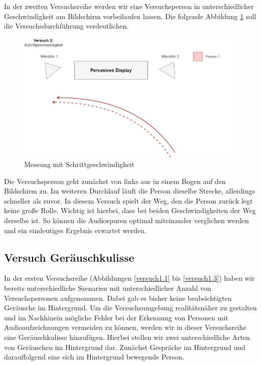 In der zweiten Versuchsreihe werden wir eine Versuchsperson in unterschiedlicher Geschwindigkeit am Bildschirm vorbeilaufen lassen. Die folgende Abbildung \ref{versuch2} soll die Versuchsdurchführung verdeutlichen. 

 
\begin{figure}[H]
	\begin{center}
		\includegraphics[width=\textwidth]{images/Versuch 2.PNG}
		\caption{Messung mit Schrittgeschwindigkeit}
	\label{versuch2}
	\end{center}
\end{figure}


Die Versuchsperson geht zunächst von links aus in einem Bogen auf den Bildschirm zu. Im weiteren Durchlauf läuft die Person dieselbe Strecke, allerdings schneller als zuvor. In diesem Versuch spielt der Weg, den die Person zurück legt keine große Rolle. Wichtig ist hierbei, dass bei beiden Geschwindigkeiten der Weg derselbe ist. So können die Audiospuren optimal miteinander verglichen werden und ein eindeutiges Ergebnis erwartet werden.

\subsection{Versuch Geräuschkulisse}

In der ersten Versuchsreihe (Abbildungen \ref{versuch1.1} bis \ref{versuch1.3}) haben wir bereits unterschiedliche Szenarien mit unterschiedlicher Anzahl von Versuchspersonen aufgenommen. Dabei gab es bisher keine beabsichtigten Geräusche im Hintergrund. Um die Versuchsumgebung realitätsnäher zu gestalten und im Nachhinein mögliche Fehler bei der Erkennung von Personen mit Audioaufzeichnungen vermeiden zu können, werden wir in dieser Versuchsreihe eine Geräuschkulisse hinzufügen. Hierbei stellen wir zwei unterschiedliche Arten von Geräuschen im Hintergrund dar. Zunächst Gespräche im Hintergrund und darauffolgend eine sich im Hintergrund bewegende Person.

